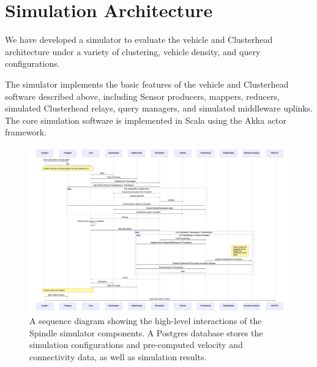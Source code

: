 \documentclass{thesis}
\begin{document}


\section{Simulation Architecture}
    We have developed a simulator to evaluate the vehicle and Clusterhead architecture under a variety of clustering,
    vehicle density, and query configurations.

    The simulator implements the basic features of the vehicle and Clusterhead software described above, including
    Sensor producers, mappers, reducers, simulated Clusterhead relays, query managers, and simulated middleware uplinks.
    The core simulation software is implemented in Scala using the Akka actor framework.
    \begin{landscape}
        \begin{figure}
            \centering
            \includegraphics[width=\textwidth]{binImages/simulator-sequence.png}
            \caption{A sequence diagram showing the high-level interactions of
            the Spindle simulator components. A Postgres database stores the
            simulation configurations and pre-computed velocity and connectivity
            data, as well as simulation results.}
        \end{figure}
    \end{landscape}
\end{document}
